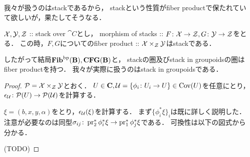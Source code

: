 我々が扱うのはstackであるから，
stackという性質がfiber productで保たれていて欲しいが，果たしてそうなる．
\begin{Prop}
    $\mathcal{X}, \mathcal{Y}, \mathcal{Z}$ :: stack over $\cat{C}$とし，
    morphism of stacks :: $F \colon \mathcal{X} \to \mathcal{Z}, G \colon \mathcal{Y} \to \mathcal{Z}$をとる．
    この時，$F, G$についてのfiber product :: $\mathcal{X} \times_{\mathcal{Z}} \mathcal{Y}$はstackである．
\end{Prop}
したがって結局$\mathbf{Fib}^{\mathrm{bp}}(\mathbf{B}), \mathbf{CFG}(\mathbf{B})$と，
stackの圏及びstack in groupoidsの圏はfiber productを持つ．
我々が実際に扱うのはstack in groupoidsである．
\begin{proof}
    $\mathcal{P}=\mathcal{X} \times_{\mathcal{Z}} \mathcal{Y}$とおく．
    $U \in \mathbf{C}, \mathcal{U}=\{\phi_i \colon U_i \to U\} \in \operatorname{Cov}(U)$を任意にとり，
    $\epsilon_{\mathcal{U}} \colon \mathcal{P}(U) \to \mathcal{P}(\mathcal{U})$を計算する．

    $\xi=(b, x, y, \alpha)$をとり，$\epsilon_{\mathcal{U}}(\xi)$を計算する．
    まず$\{\phi_i^*\xi\}_i$は既に詳しく説明した．
    注意が必要なのは同型$\sigma_{ij} \colon \operatorname{pr}_2^*\phi_i^*\xi \to \operatorname{pr}_1^*\phi_j^*\xi$である．
    可換性は以下の図式から分かる．
    \begin{center}
    \end{center}
    
    (TODO)

\end{proof}
